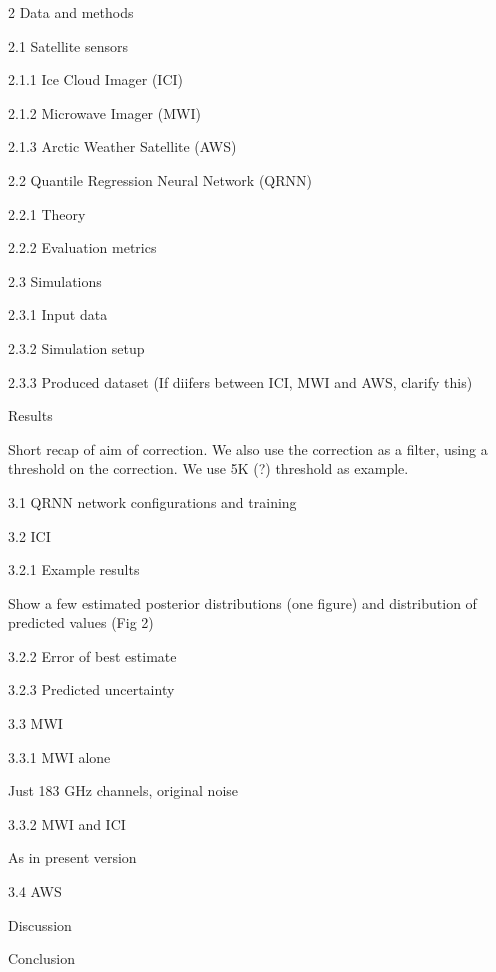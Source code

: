 \documentclass[amt, manuscript]{copernicus}
\begin{document}
2 Data and methods

2.1 Satellite sensors

2.1.1 Ice Cloud Imager (ICI)

2.1.2 Microwave Imager (MWI)

2.1.3 Arctic Weather Satellite (AWS)

2.2 Quantile Regression Neural Network (QRNN)

2.2.1 Theory

2.2.2 Evaluation metrics

2.3 Simulations

2.3.1 Input data

2.3.2 Simulation setup

2.3.3 Produced dataset
(If diifers between ICI, MWI and AWS, clarify this)

 Results

Short recap of aim of correction. We also use the correction as a filter, using
a threshold on the correction. We use 5K (?) threshold as example.

3.1 QRNN network configurations and training

3.2 ICI

3.2.1 Example results

Show a few estimated posterior distributions (one figure) and distribution of
predicted values (Fig 2)

3.2.2 Error of best estimate

3.2.3 Predicted uncertainty

3.3 MWI

3.3.1 MWI alone

Just 183 GHz channels, original noise

3.3.2 MWI and ICI

As in present version

3.4 AWS

 Discussion

 Conclusion


\newpage





\end{document}
